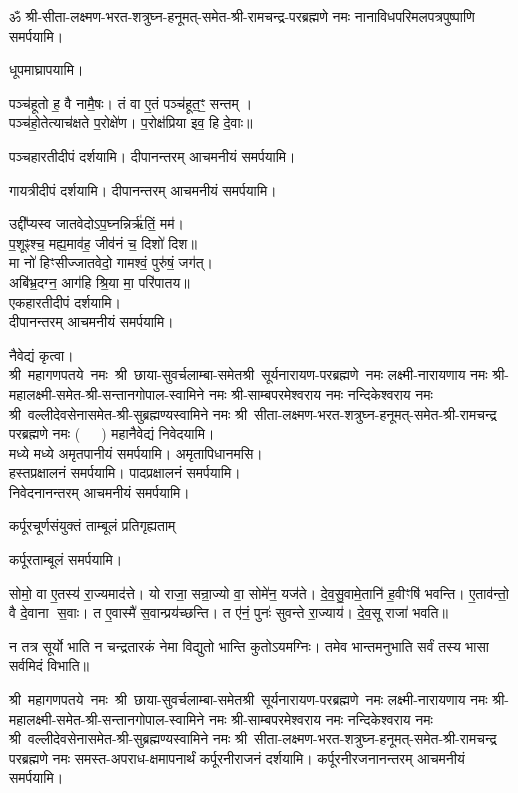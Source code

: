 \begin{center}
ॐ श्री-सीता-लक्ष्मण-भरत-शत्रुघ्न-हनूमत्-समेत-श्री-रामचन्द्र-परब्रह्मणे नमः नानाविधपरिमलपत्रपुष्पाणि समर्पयामि। \medskip

\newcommand{\swamine}{श्री~महागणपतये~नमः~श्री~छाया-सुवर्चलाम्बा-समेत\-श्री~सूर्यनारायण-परब्रह्मणे~नमः लक्ष्मी-नारायणाय नमः श्री-महालक्ष्मी-समेत-श्री-सन्तानगोपाल-स्वामिने नमः श्री-साम्बपरमेश्वराय नमः नन्दिकेश्वराय नमः श्री~वल्लीदेवसेनासमेत-श्री-सुब्रह्मण्यस्वामिने नमः श्री~सीता-लक्ष्मण-भरत-शत्रुघ्न-हनूमत्-समेत-श्री-रामचन्द्र परब्रह्मणे नमः}

धूपमाघ्रापयामि।\medskip

पञ्च॑हूतो ह॒ वै नामै॒षः। तं वा ए॒तं पञ्च॑हूत॒ꣳ॒ सन्तम्।\\
पञ्च॑हो॒तेत्याच॑क्षते प॒रोक्षे॑ण। प॒रोक्ष॑प्रिया इव॒ हि दे॒वाः॥

पञ्चहारतीदीपं दर्शयामि। दीपानन्तरम् आचमनीयं समर्पयामि।\medskip

गायत्रीदीपं दर्शयामि। दीपानन्तरम् आचमनीयं समर्पयामि।\medskip

उद्दी᳚प्यस्व जातवेदोऽप॒घ्नन्निर्ऋ॑तिं॒ मम॑।\\
प॒शूꣴश्च॒ मह्य॒माव॑ह॒ जीव॑नं च॒ दिशो॑ दिश॥ \\
मा नो॑ हिꣳसीज्जातवेदो॒ गामश्वं॒ पुरु॑षं॒ जग॑त्।\\
अबि॑भ्र॒दग्न॒ आग॑हि श्रि॒या मा॒ परि॑पातय॥ \\
एकहारतीदीपं दर्शयामि।\\
दीपानन्तरम् आचमनीयं समर्पयामि।\medskip

नैवेद्यं कृत्वा।\\
\swamine{} \mbox{(~~~)} महानैवेद्यं निवेदयामि।\\
मध्ये मध्ये अमृतपानीयं समर्पयामि। अमृतापिधानमसि।\\
हस्तप्रक्षालनं समर्पयामि। पादप्रक्षालनं समर्पयामि।\\
निवेदनानन्तरम् आचमनीयं समर्पयामि।\medskip

{कर्पूरचूर्णसंयुक्तं ताम्बूलं प्रतिगृह्यताम्}

कर्पूरताम्बूलं समर्पयामि।\medskip

सोमो॒ वा ए॒तस्य॑ रा॒ज्यमाद॑त्ते।
यो राजा॒ सन्रा॒ज्यो वा॒ सोमे॑न॒ यज॑ते।
दे॒व॒सु॒वामे॒तानि॑ ह॒वीꣳषि॑ भवन्ति।
ए॒ताव॑न्तो॒ वै दे॒वाना स॒वाः।
त ए॒वास्मै॑ स॒वान्प्रय॑च्छन्ति।
त ए॑नं॒ पुनः॑ सुवन्ते रा॒ज्याय॑।
दे॒व॒सू राजा॑ भवति॥

न तत्र सूर्यो भाति न चन्द्रतारकं नेमा विद्युतो भान्ति कुतोऽयमग्निः।
तमेव भान्तमनुभाति सर्वं तस्य भासा सर्वमिदं विभाति॥


\swamine{} समस्त-अपराध-क्षमापनार्थं कर्पूरनीराजनं दर्शयामि। कर्पूरनीरजनानन्तरम् आचमनीयं समर्पयामि।\medskip



\end{center}
